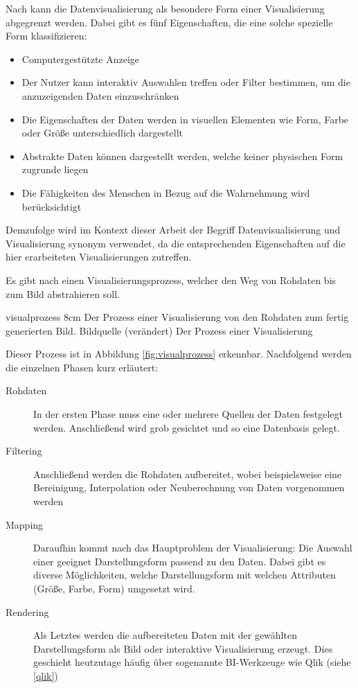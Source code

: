 Nach \cite{Card.2007} kann die Datenvisualisierung als besondere Form einer Visualisierung abgegrenzt werden.
Dabei gibt es fünf Eigenschaften, die eine solche spezielle Form klassifizieren:
\begin{itemize}
\item Computergestützte Anzeige 
\item Der Nutzer kann interaktiv Auswahlen treffen oder Filter bestimmen, um die anzuzeigenden Daten einzuschränken
\item Die Eigenschaften der Daten werden in visuellen Elementen wie Form, Farbe oder Größe unterschiedlich dargestellt
\item Abstrakte Daten können dargestellt werden, welche keiner physischen Form zugrunde liegen
\item Die Fähigkeiten des Menschen in Bezug auf die Wahrnehmung wird berücksichtigt 
\end{itemize}

Demzufolge wird im Kontext dieser Arbeit der Begriff Datenvisualisierung und Visualisierung synonym verwendet, da die entsprechenden Eigenschaften auf die hier erarbeiteten Visualisierungen zutreffen.

Es gibt nach \cite{Schumann.2000} einen \glqq Visualisierungsprozess\grqq{}, welcher den Weg von Rohdaten bis zum Bild abstrahieren soll.

\bild
{visualprozess}
{8cm}
{Der Prozess einer Visualisierung von den Rohdaten zum fertig generierten Bild. Bildquelle \cite[S.50]{FischerStabel.2018} (verändert)}
{Der Prozess einer Visualisierung}

Dieser Prozess ist in Abbildung \ref{fig:visualprozess} erkennbar.
Nachfolgend werden die einzelnen Phasen kurz erläutert:
\begin{description}
\item[Rohdaten] In der ersten Phase muss eine oder mehrere Quellen der Daten festgelegt werden. 
Anschließend wird grob gesichtet und so eine Datenbasis gelegt.
\item[Filtering] Anschließend werden die Rohdaten aufbereitet, wobei beispielsweise eine Bereinigung, Interpolation oder Neuberechnung von Daten vorgenommen werden
\item[Mapping] Daraufhin kommt nach \cite{FischerStabel.2018} das Hauptproblem der Visualisierung: Die Auswahl einer geeignet Darstellungsform passend zu den Daten. 
Dabei gibt es diverse Möglichkeiten, welche Darstellungsform mit welchen Attributen (Größe, Farbe, Form) umgesetzt wird. 
\item[Rendering] Als Letztes werden die aufbereiteten Daten mit der gewählten Darstellungsform als Bild oder interaktive Visualisierung erzeugt.
Dies geschieht heutzutage häufig über sogenannte \gls{BI}-Werkzeuge wie Qlik (siehe \ref{qlik})
\end{description}




